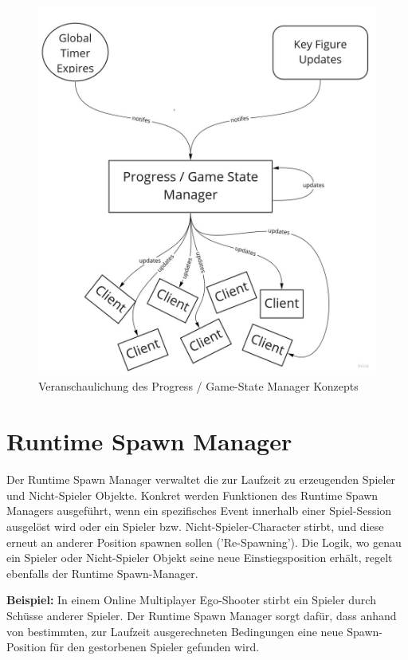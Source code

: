 \begin{figure}
	\centering
	\includegraphics[width=150mm]{images/Progress_State_Manager.jpg}
	\caption[Progress / Game-State Manager]{Veranschaulichung des Progress / Game-State Manager Konzepts}
	\label{pic:Progress_State_Manager}
\end{figure}

\section{Runtime Spawn Manager}
\label{spawn_manager}

Der Runtime Spawn Manager verwaltet die zur Laufzeit zu erzeugenden Spieler und Nicht-Spieler Objekte. Konkret werden Funktionen des Runtime Spawn Managers ausgeführt, wenn ein spezifisches Event innerhalb einer Spiel-Session ausgelöst wird oder ein Spieler bzw. Nicht-Spieler-Character stirbt, und diese erneut an anderer Position spawnen sollen ('Re-Spawning'). Die Logik, wo genau ein Spieler oder Nicht-Spieler Objekt seine neue Einstiegsposition erhält, regelt ebenfalls der Runtime Spawn-Manager.

\textbf{Beispiel:} In einem Online Multiplayer Ego-Shooter \cite{Wikipedia.2021g} stirbt ein Spieler durch Schüsse anderer Spieler. Der Runtime Spawn Manager sorgt dafür, dass anhand von bestimmten, zur Laufzeit ausgerechneten Bedingungen eine neue Spawn-Position für den gestorbenen Spieler gefunden wird. 


